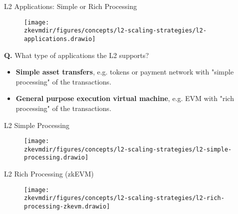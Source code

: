 







\begin{frame}{L2 Applications: Simple or Rich Processing}
\begin{figure}
\texttt{[image: \\zkevmdir/figures/concepts/l2-scaling-strategies/l2-applications.drawio]}
\end{figure}

\textbf{Q.} What type of applications the L2 supports?
\begin{itemize}
\item \textbf{Simple asset transfers}, e.g. tokens or payment network with "simple processing" of the transactions.
\item \textbf{General purpose execution virtual machine}, e.g. EVM with "rich processing" of the transactions.
\end{itemize}
\end{frame}





\begin{frame}{L2 Simple Processing}
\begin{figure}
\texttt{[image: \\zkevmdir/figures/concepts/l2-scaling-strategies/l2-simple-processing.drawio]}
\end{figure}
\end{frame}






\begin{frame}{L2 Rich Processing (zkEVM)}
\begin{figure}
\texttt{[image: \\zkevmdir/figures/concepts/l2-scaling-strategies/l2-rich-processing-zkevm.drawio]}
\end{figure}
\end{frame}



